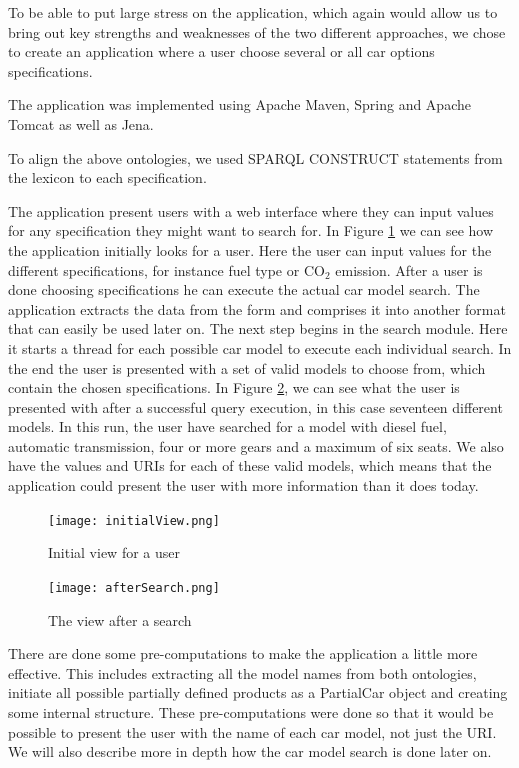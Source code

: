 \documentclass{llncs}
\begin{document}
To be able to put large stress on the application, which again would
allow us to bring out key strengths and weaknesses of the two
different approaches, we chose to create an application where a user
choose several or all car options specifications.

The application was implemented using Apache Maven, Spring and Apache
Tomcat as well as Jena.

To align the above ontologies, we used SPARQL CONSTRUCT statements
from the lexicon to each specification.

The application present users with a web interface where they can
input values for any specification they might want to search for.  In
Figure \ref{initialView} we can see how the application initially
looks for a user. Here the user can input values for the different
specifications, for instance fuel type or CO$_2$ emission. After a
user is done choosing specifications he can execute the actual car
model search. The application extracts the data from the form and
comprises it into another format that can easily be used later on. The
next step begins in the search module. Here it starts a thread for
each possible car model to execute each individual search. In the end
the user is presented with a set of valid models to choose from, which
contain the chosen specifications. In Figure \ref{afterSearch}, we
can see what the user is presented with after a successful query
execution, in this case seventeen different models. In this run, the
user have searched for a model with diesel fuel, automatic
transmission, four or more gears and a maximum of six seats. We also
have the values and URIs for each of these valid models, which means
that the application could present the user with more information than
it does today.

\begin{figure}
  \centering
      \texttt{[image: initialView.png]}
  \caption{Initial view for a user}\label{initialView}
\end{figure}

\begin{figure}
  \centering
      \texttt{[image: afterSearch.png]}
  \caption{The view after a search}\label{afterSearch}
\end{figure}
There are done some pre-computations to make the application a little
more effective. This includes extracting all the model names from both
ontologies, initiate all possible partially defined products as a
PartialCar object and creating some internal structure. These
pre-computations were done so that it would be possible to present the
user with the name of each car model, not just the URI. We will also
describe more in depth how the car model search is done later on.
\end{document}

